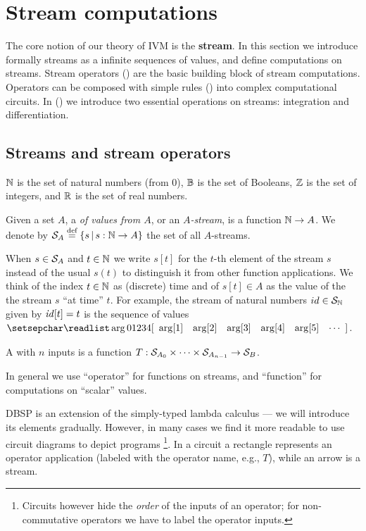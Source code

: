 \section{Stream computations}\label{sec:streams}

The core notion of our theory of IVM is the \textbf{stream}.
In this section we introduce formally streams as a
infinite sequences of values, and define computations on streams.
Stream operators () are the basic building block of stream
computations.  Operators can be composed with simple rules ()
into complex computational circuits.
In () we introduce two essential operations on streams:
integration and differentiation.

\subsection{Streams and stream operators}\label{sec:notation}

$\mathbb{N}$ is the set of natural numbers (from 0), $\mathbb{B}$ is the set of
Booleans, $\mathbb{Z}$ is the set of integers, and $\mathbb{R}$ is the set of real
numbers.

\begin{definition}[stream]
Given a set $A$, a  \emph{of values from $A$}, or an
\emph{$A$-stream}, is a function $\mathbb{N} \rightarrow A$.  We denote by
$\mathcal{S}_{A} \stackrel{\textrm{\scriptsize def}}{=} \{ s \,|\, s : \mathbb{N} \to A \}$ the set of all
$A$-streams.
\end{definition}

When $s\in\mathcal{S}_{A}$ and $t\in\mathbb{N}$ we
write $s[t]$ for the $t$-th element of the stream $s$ instead of the usual $s(t)$
to distinguish it from other function applications.
We think of the index $t\in\mathbb{N}$ as (discrete) time and of $s[t]\in A$
as the value of the the stream $s$ ``at time'' $t$.
\ifstreamexamples
For example, the stream of natural numbers $id \in \mathcal{S}_{\mathbb{N}}$ given by $\mathit{id}[t] = t$ is the sequence of values
$\sv{0 1 2 3 4}$.
\fi

\begin{definition}
A  with $n$ inputs is a function
$T:\mathcal{S}_{A_0}\times\cdots\times\mathcal{S}_{A_{n-1}}\to\mathcal{S}_{B}$.
\end{definition}

In general we use ``operator'' for functions on streams, and
``function'' for computations on ``scalar'' values.

DBSP is an extension of the simply-typed lambda calculus ---
we will introduce its elements gradually.  However, in many cases we find it more readable to
use circuit diagrams to depict \dbsp programs
\footnote{Circuits however hide the \emph{order} of the inputs of an operator; for non-commutative
operators we have to label the operator inputs.}.
In a circuit a rectangle represents an operator application (labeled
with the operator name, e.g., $T$), while an arrow is a stream.

